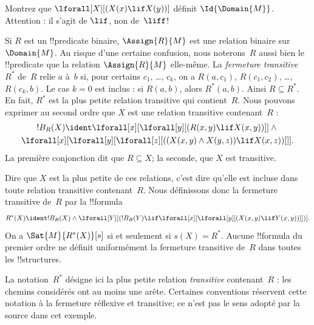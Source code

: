 \documentclass[../../../include/open-logic-section]{subfiles}
\begin{document}
\begin{prob}
Montrez que
$\lforall[X][(X(x)\lif X(y))]$
définit $\Id{\Domain{M}}$.
Attention : il s'agit de $\lif$, non de~$\liff$!
\end{prob}

\begin{ex}
Si $R$ est un !!{predicate} binaire,
$\Assign{R}{M}$ est une relation binaire
sur~$\Domain{M}$. Au risque d'une certaine
confusion, nous noterons~$R$ aussi bien le
!!{predicate} que la relation
$\Assign{R}{M}$ elle-même. La
\emph{fermeture transitive}~$R^*$ de~$R$
relie $a$ à~$b$ si, pour certains
$c_1$, \dots, $c_k$, on a
$R(a,c_1)$, $R(c_1,c_2)$, \dots, $R(c_k,b)$.
Le cas $k=0$ est inclus : si $R(a,b)$,
alors $R^*(a,b)$. Ainsi $R\subseteq R^*$.
En fait, $R^*$ est la plus petite relation
transitive qui contient~$R$. Nous pouvons exprimer
au second ordre que $X$ est une relation
transitive contenant~$R$ :
\begin{multline*}
!B_R(X)\ident
\lforall[x][\lforall[y][(R(x,y)\lif X(x,y))]]
\land {}\\
\lforall[x][\lforall[y][\lforall[z]
[((X(x,y)\land X(y,z))\lif X(x,z))]]].
\end{multline*}
La première conjonction dit que $R\subseteq X$;
la seconde, que $X$ est transitive.

Dire que $X$ est la plus petite de ces relations,
c'est dire qu'elle est incluse dans toute relation
transitive contenant~$R$. Nous définissons donc
la fermeture transitive de~$R$ par la
!!{formula}
\[
R^*(X)\ident !B_R(X)\land
\lforall[Y][(!B_R(Y)\lif
\lforall[x][\lforall[y][(X(x,y)\lif Y(x,y))]])].
\]
On a $\Sat{M}{R^*(X)}[s]$ si et seulement si
$s(X)=R^*$. Aucune !!{formula} du premier ordre ne définit uniformément
la fermeture transitive de~$R$ dans toutes les !!{structure}s.
\end{ex}

\begin{editorial}
La notation~$R^*$ désigne ici la plus petite
relation \emph{transitive} contenant~$R$ :
les chemins considérés ont au moins une arête.
Certaines conventions réservent cette notation à
la fermeture réflexive et transitive; ce n'est
pas le sens adopté par la source dans cet exemple.
\end{editorial}
\end{document}
